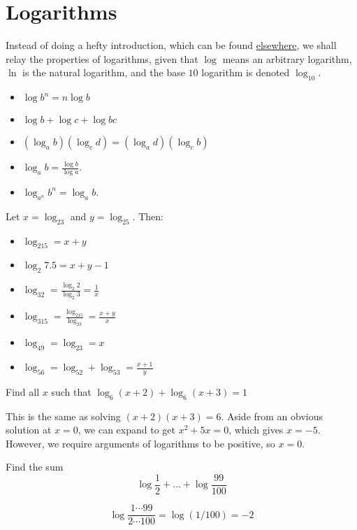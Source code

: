 \documentclass[11pt]{scrreport}
\begin{document}
\chapter{Logarithms}
Instead of doing a hefty introduction, which can be found \href{https://www.khanacademy.org/math/algebra2/x2ec2f6f830c9fb89:logs}{elsewhere}, we shall relay the properties of logarithms, given that $\log$ means an arbitrary logarithm, $\ln$ is the natural logarithm, and the base $10$ logarithm is denoted $\log_{10}$.
\begin{itemize}
    \item $\log b^n = n\log b$
    \item $\log b + \log c + \log bc$
    \item $(\log_a b)(\log_c d) = (\log_a d)(\log_c b)$
    \item $\log_a b = \frac{\log b}{\log a}$.
    \item $\log_{a^n}b^n = \log_a b$.
\end{itemize}
\begin{example}
    Let $x=\log_23$ and $y=\log_25$. Then:
    \begin{itemize}
        \item $\log_215=x+y$
        \item $\log_2{7.5}=x+y-1$
        \item $\log_32 = \frac{\log_2 2}{\log_2 3} = \frac{1}{x}$
        \item $\log_315 =\frac{\log_215}{\log_23}=\frac{x+y}{x}$
        \item $\log_49=\log_23=x$
        \item $\log_56=\log_52+\log_53=\frac{x+1}{y}$
    \end{itemize}
\end{example}
\begin{exercise}
    Find all $x$ such that $\log_6(x+2)+\log_6(x+3)=1$
\end{exercise}
\begin{soln}
    This is the same as solving $(x+2)(x+3) = 6$. Aside from an obvious solution at $x=0$, we can expand to get $x^2+5x=0$, which gives $x=-5$. However, we require arguments of logarithms to be positive, so $x=0$.
\end{soln}

\begin{exercise}
    Find the sum \[\log\frac{1}{2}+\dots + \log\frac{99}{100}\]
\end{exercise}
\begin{soln}
    \[\log\frac{1\cdots99}{2\cdots100}=\log(1/100)=-2\]
\end{soln}
\end{document}
